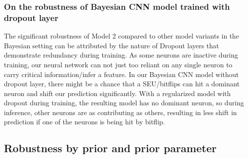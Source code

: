 \documentclass[ %
                    author={Revalda Putawara},
                supervisor={Dr. James Pope},
                    degree={MSc},
                     title={Robustness of Bayesian Neural Networks Design Choices Against Weight and Bias Perturbation Induced by Single Event Upsets (SEUs)},
                      type={},
                      year={2025}]{dissertation}
\begin{document}
\subsubsection{On the robustness of Bayesian CNN model trained with dropout layer}

The significant robustness of Model 2 compared to other model variants in the Bayesian setting can be attributed by the nature of Dropout layers that demonstrate redundancy during training. As some neurons are inactive during training, our neural network can not just too reliant on any single neuron to carry critical information/infer a feature. In our Bayesian CNN model without dropout layer, there might be a chance that a SEU/bitflips can hit a dominant neuron and shift our prediction significantly. With a regularized model with dropout during training, the resulting model has no dominant neuron, so during inference, other neurons are as contributing as others, resulting in less shift in prediction if one of the neurons is being hit by bitflip.



\subsection{Robustness by prior and prior parameter}

\end{document}
